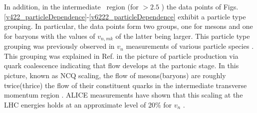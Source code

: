 \newpage

In addition, in the intermediate \pT~region (for \pT $> 2.5$ \GeV) the data points of Figs. \ref{v422_particleDependence}-\ref{v6222_particleDependence} exhibit a particle type grouping. In particular, the data points form two groups, one for mesons and one for baryons with the values of $v_{n,mk}$ of the latter being larger. This particle type grouping was previously observed in $v_{n}$ measurements of various particle species \cite{Abelev:2014pua,Adam:2016nfo,Acharya:2018zuq,Adams:2003am,Abelev:2007qg,Adler:2003kt,Adare:2006ti}. 
This grouping was explained in Ref. \cite{Molnar:2003ff} in the picture of particle production via quark coalescence indicating that flow develops at the partonic stage. In this picture, known as NCQ scaling, the flow of mesons(baryons) are roughly twice(thrice) the flow of their constituent quarks in the intermediate transverse momentum region \cite{Voloshin:2002wa,Molnar:2003ff}. ALICE measurements have shown that this scaling at the LHC energies holds at an approximate level of 20\% for $v_{n}$ \cite{Abelev:2014pua,Adam:2016nfo,Acharya:2018zuq}. %


